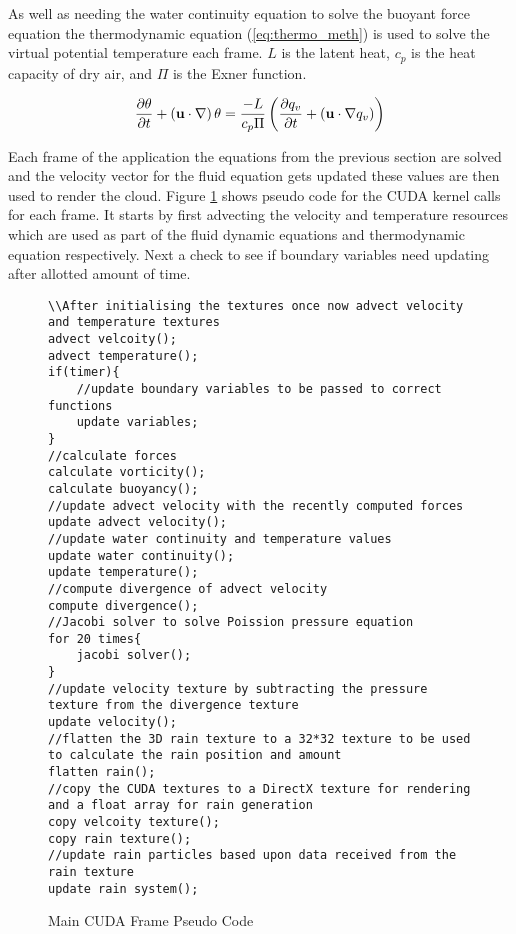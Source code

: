 As well as needing the water continuity equation to solve the buoyant force equation the thermodynamic equation (\ref{eq:thermo_meth}) is used to solve the virtual potential temperature each frame. $L$ is the latent heat, $c_{p}$ is the heat capacity of dry air, and $\Pi$ is the Exner function. 

\begin{equation} \label{eq:thermo_meth}
  \centering
  \frac{\partial\theta}{\partial t} + \left(\mathbf{u}\cdot\nabla\right)\theta = \frac{-L}{c_{p}\Pi}\left(\frac{\partial q_{v}}{\partial t} + \left(\mathbf{u\cdot\nabla}q_{v}\right)\right)
\end{equation}

Each frame of the application the equations from the previous section are solved and the velocity vector for the fluid equation gets updated these values are then used to render the cloud.
Figure \ref{sc:UpdateCloudPseudoCode} shows pseudo code for the CUDA kernel calls for each frame.
It starts by first advecting the velocity and temperature resources which are used as part of the fluid dynamic equations and thermodynamic equation respectively.
Next a check to see if boundary variables need updating after allotted amount of time.

\begin{figure}[h|]
\centering
\begin{lstlisting}
\\After initialising the textures once now advect velocity and temperature textures
advect velcoity();
advect temperature();
if(timer){
	//update boundary variables to be passed to correct functions
	update variables;
}
//calculate forces
calculate vorticity();
calculate buoyancy();
//update advect velocity with the recently computed forces
update advect velocity();
//update water continuity and temperature values
update water continuity();
update temperature();
//compute divergence of advect velocity
compute divergence();
//Jacobi solver to solve Poission pressure equation
for 20 times{
	jacobi solver();
}
//update velocity texture by subtracting the pressure texture from the divergence texture
update velocity();
//flatten the 3D rain texture to a 32*32 texture to be used to calculate the rain position and amount
flatten rain();
//copy the CUDA textures to a DirectX texture for rendering and a float array for rain generation
copy velcoity texture();
copy rain texture();
//update rain particles based upon data received from the rain texture
update rain system();
\end{lstlisting}
\caption{Main CUDA Frame Pseudo Code}
\label{sc:UpdateCloudPseudoCode}
\end{figure}


